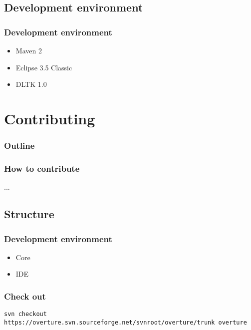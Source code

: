 \subsection{Development environment}
\frame
{
  \frametitle{Development environment}


\begin{center}
  \begin{itemize}
  		\item Maven 2
  		\item Eclipse 3.5 Classic
  		\item DLTK 1.0
  \end{itemize}
\end{center}
}

\section{Contributing}
%
%
\begin{frame}
  \frametitle{Outline}
  \tableofcontents[current]
\end{frame}


\frame
{
  \frametitle{How to contribute}


\begin{center}
  ...
\end{center}
}

\subsection{Structure}
\frame
{
  \frametitle{Development environment}


\begin{center}
  \begin{itemize}
  		\item Core
  		\item IDE
  \end{itemize}
\end{center}
}

\frame
{
  \frametitle{Check out}


\begin{center}
\small \texttt{svn checkout https://overture.svn.sourceforge.net/svnroot/overture/trunk overture}
\end{center}
}

